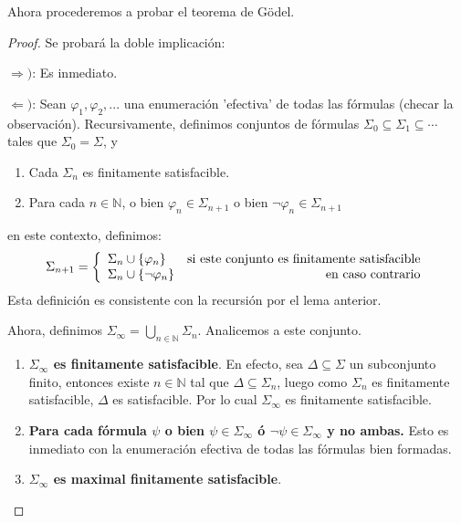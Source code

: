 \documentclass[12pt]{report}
\theoremstyle{largebreak}
\begin{document}
    Ahora procederemos a probar el teorema de Gödel. 

    \begin{proof}
        Se probará la doble implicación:
        
        $\Rightarrow)$: Es inmediato.

        $\Leftarrow)$: Sean $\varphi_1,\varphi_2,...$ una enumeración 'efectiva' de todas las fórmulas (checar la observación). Recursivamente, definimos conjuntos de fórmulas $\Sigma_0\subseteq\Sigma_1\subseteq\cdots$ tales que $\Sigma_0=\Sigma$, y
        \begin{enumerate}
            \item Cada $\Sigma_n$ es finitamente satisfacible.
            \item Para cada $n\in\mathbb{N}$, o bien $\varphi_n\in\Sigma_{n+1}$ o bien $\neg\varphi_n\in\Sigma_{n+1}$
        \end{enumerate}
        en este contexto, definimos:
        \begin{equation*}
            \Sigma_{n+1}=\left\{\begin{array}{lr}
                    \Sigma_n\cup\left\{\varphi_n \right\} & \textup{si este conjunto es finitamente satisfacible}\\
                    \Sigma_n\cup\left\{\neg \varphi_n \right\} & \textup{en caso contrario}\\
                \end{array}
            \right.
        \end{equation*}
        Esta definición es consistente con la recursión por el lema anterior.

        Ahora, definimos $\Sigma_\infty=\bigcup_{n\in\mathbb{N}}\Sigma_n$. Analicemos a este conjunto.

        \begin{enumerate}
            \item \textbf{$\Sigma_\infty$ es finitamente satisfacible}. En efecto, sea $\Delta\subseteq\Sigma$ un subconjunto finito, entonces existe $n\in\mathbb{N}$ tal que $\Delta\subseteq\Sigma_n$, luego como $\Sigma_n$ es finitamente satisfacible, $\Delta$ es satisfacible. Por lo cual $\Sigma_\infty$ es finitamente satisfacible.
            \item \textbf{Para cada fórmula $\psi$ o bien $\psi\in\Sigma_\infty$ ó $\neg\psi\in\Sigma_\infty$ y no ambas.} Esto es inmediato con la enumeración efectiva de todas las fórmulas bien formadas.
            \item \textbf{$\Sigma_\infty$ es maximal finitamente satisfacible}.
        \end{enumerate}


\end{proof}
\end{document}
